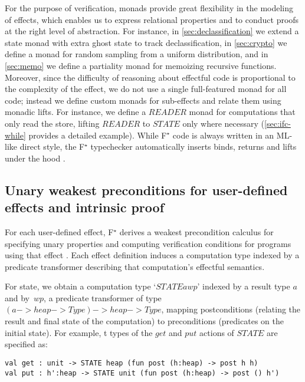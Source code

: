 \documentclass[sigplan,screen]{acmart}\settopmatter{}
\newcommand\fstar{F$^\star$\xspace}
\begin{document}
For the purpose of verification, monads provide great flexibility in
the modeling of effects, which enables us to express relational
properties and to conduct proofs at the right level of abstraction.
%
For instance, \iffull in \autoref{sec:declassification} we extend a state
monad with extra ghost state to track declassification, \fi  in
\autoref{sec:crypto} we define a monad for random sampling from a
uniform distribution, and  in \autoref{sec:memo} we define a partiality
monad for memoizing recursive functions.
%
Moreover, since the difficulty of reasoning about effectful code is
proportional to the complexity of the effect, we do not use a single
full-featured monad for all code; instead we define custom monads for
sub-effects and relate them using monadic lifts.
%
For instance, we define a \ls$READER$ monad for computations that only
read the store, lifting \ls$READER$ to \ls$STATE$ only where
necessary (\autoref{sec:ifc-while} provides a detailed example).
%
While \fstar{} code is always written in an ML-like direct style, the
\fstar{} typechecker automatically inserts binds, returns and lifts under
the hood \cite{swamy11coco}.

\subsection{Unary weakest preconditions for user-defined effects and intrinsic proof}
\label{sec:wp}

For each user-defined effect, \fstar derives a weakest precondition
calculus for specifying unary properties and computing verification
conditions for programs using that effect \cite{dm4free}.
%
Each effect definition induces a computation type indexed by a
predicate transformer describing that computation's effectful
semantics.

For state, we obtain a computation type
%
`\ls$STATE a wp$' indexed by a result type \ls$a$ and by~\ls$wp$,
%
a predicate transformer of type
%
\ls$(a -> heap -> Type) -> heap -> Type$,
mapping postconditions (relating the result and final state of the
computation) to preconditions (predicates on the initial state).
%
\iffull For example, t types of the \ls$get$ and \ls$put$ actions
of \ls$STATE$ are specified as:

\begin{lstlisting}
val get : unit -> STATE heap (fun post (h:heap) -> post h h)
val put : h':heap -> STATE unit (fun post (h:heap) -> post () h')
\end{lstlisting}
\end{document}
